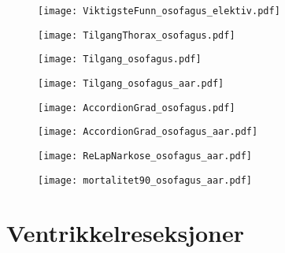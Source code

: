 \documentclass[norsk,a4paper]{article}\usepackage[]{graphicx}\usepackage[]{color}
\begin{document}
\begin{figure}[ht]
\centering
\texttt{[image: ViktigsteFunn\_osofagus\_elektiv.pdf]}
\caption{}
\end{figure}

\begin{figure}[ht]
\centering
\texttt{[image: TilgangThorax\_osofagus.pdf]}
\caption{}
\end{figure}

\begin{figure}[ht]
\centering
\texttt{[image: Tilgang\_osofagus.pdf]}
\caption{}
\end{figure}

\begin{figure}[ht]
\centering
\texttt{[image: Tilgang\_osofagus\_aar.pdf]}
\caption{}
\end{figure}

\begin{figure}[ht]
\centering
\texttt{[image: AccordionGrad\_osofagus.pdf]}
\caption{}
\end{figure}

\begin{figure}[ht]
\centering
\texttt{[image: AccordionGrad\_osofagus\_aar.pdf]}
\caption{}
\end{figure}

\begin{figure}[ht]
\centering
\texttt{[image: ReLapNarkose\_osofagus\_aar.pdf]}
\caption{}
\end{figure}

\begin{figure}[ht]
\centering
\texttt{[image: mortalitet90\_osofagus\_aar.pdf]}
\caption{}
\end{figure}

\clearpage




\section{Ventrikkelreseksjoner}
\end{document}
